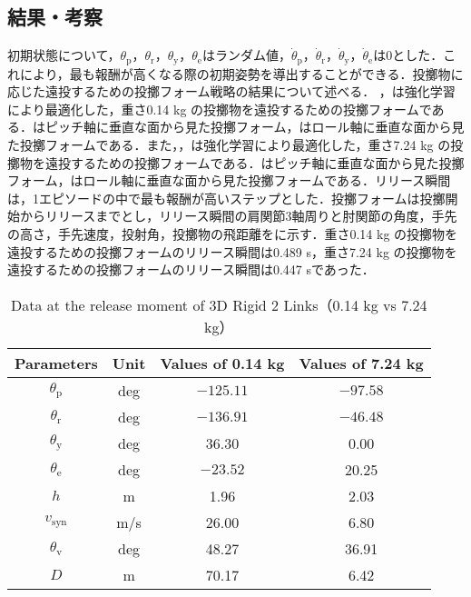 \subsection{結果・考察}
初期状態について，$\theta_{\mathrm{p}}$，$\theta_{\mathrm{r}}$，$\theta_{\mathrm{y}}$，$\theta_{\mathrm{e}}$はランダム値，$\dot{\theta}_{\mathrm{p}}$，$\dot{\theta}_{\mathrm{r}}$，$\dot{\theta}_{\mathrm{y}}$，$\dot{\theta}_{\mathrm{e}}$は0とした．これにより，最も報酬が高くなる際の初期姿勢を導出することができる．投擲物に応じた遠投するための投擲フォーム戦略の結果について述べる．
，は強化学習により最適化した，重さ0.14 kg の投擲物を遠投するための投擲フォームである．はピッチ軸に垂直な面から見た投擲フォーム，はロール軸に垂直な面から見た投擲フォームである．また，，は強化学習により最適化した，重さ7.24 kg の投擲物を遠投するための投擲フォームである．はピッチ軸に垂直な面から見た投擲フォーム，はロール軸に垂直な面から見た投擲フォームである．リリース瞬間は，1エピソードの中で最も報酬が高いステップとした．投擲フォームは投擲開始からリリースまでとし，リリース瞬間の肩関節3軸周りと肘関節の角度，手先の高さ，手先速度，投射角，投擲物の飛距離をに示す．重さ0.14 kg の投擲物を遠投するための投擲フォームのリリース瞬間は0.489 s，重さ7.24 kg の投擲物を遠投するための投擲フォームのリリース瞬間は0.447 sであった．

\begin{table}[tb]
  \begin{center}
    \caption{Data at the release moment of 3D Rigid 2 Links（0.14 kg vs 7.24 kg）}
    \begin{tabular}{c|c|c|c}
      \hline
      Parameters & Unit & Values of 0.14 kg & Values of 7.24 kg \\
      \hline
      $\theta_{\mathrm{p}}$ & deg & $-125.11$ & $-97.58$ \\
      $\theta_{\mathrm{r}}$ & deg & $-136.91$ & $-46.48$ \\
      $\theta_{\mathrm{y}}$ & deg  & 36.30 & 0.00 \\
      $\theta_{\mathrm{e}}$ & deg & $-23.52$ & 20.25 \\
      $h$ & m & 1.96 & 2.03 \\
      $v_{\mathrm{syn}}$ & m/s & 26.00 & 6.80 \\
      $\theta_{\mathrm{v}}$ & deg & 48.27 & 36.91 \\
      $D$ & m & 70.17 & 6.42 \\
      \hline
    \end{tabular}
  \end{center}
\end{table}

